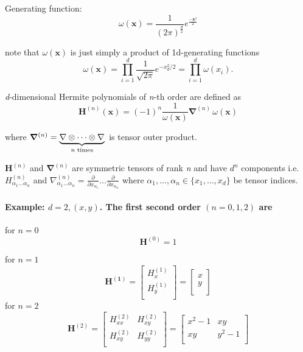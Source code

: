 \documentclass[draft]{article}
\begin{document}
Generating function:
\begin{equation}
	\omega(\bm{x}) = \frac{1}{(2\pi)^{\frac{d}{2}}}e^{\frac{-\bm{x}^2}{2}}
\end{equation}

note that $\omega(\bm{x})$ is just simply a product of 1d-generating functions
\begin{equation}
	\omega(\bm{x}) = \prod_{i=1}^{d} \frac{1}{\sqrt{2\pi}}e^{-x_d^2 / 2} = \prod_{i=1}^{d} \omega(x_i). \label{product_omega} 
\end{equation}

\textit{d}-dimensional Hermite polynomials of \textit{n}-th order are defined as
\begin{equation}
	\bm{H}^{(n)}(\bm{x}) = (-1)^{n}\frac{1}{\omega(\bm{x})}\bm{\nabla}^{(n)} \, \omega(\bm{x})
\end{equation}

where $\bm{\nabla}^{(n)} = \underbrace{\nabla \otimes\dots\otimes  \nabla}_{\text{\textit{n} times}} \, $ is tensor outer product.

$\bm{H}^{(n)}$ and $\bm{\nabla}^{(n)}$ are symmetric tensors of rank \textit{n} and have $d^n$ components i.e. $H^{(n)}_{\alpha_1\dots\alpha_n}$ and $ \nabla^{(n)}_{\alpha_1\dots\alpha_n} = \frac{\partial}{\partial x_{\alpha_1}} \dots \frac{\partial}{\partial x_{\alpha_n}}$ where $\alpha_1, \dots ,\alpha_n \in \{ x_1, \dots ,x_d \}$ be tensor indices.

\paragraph*{Example: \textnormal{$d = 2, (x, y)$. The first second order $(n=0,1,2)$ are}}
for $n=0$
$$
\bm{H}^{(0)} = 1
$$

for $n=1$
$$
\bm{H^{(1)}} = \begin{bmatrix}
	H^{(1)}_{x} \\
	H^{(1)}_{y} \\
\end{bmatrix}
=
\begin{bmatrix}
	x \\
	y \\
\end{bmatrix}
$$
for $n=2$
$$
\bm{H}^{(2)} = \begin{bmatrix}
	H^{(2)}_{xx} & H^{(2)}_{xy} \\
	H^{(2)}_{xy} & H^{(2)}_{yy} \\
\end{bmatrix}
=
\begin{bmatrix}
	x^2 - 1 & xy \\
	xy & y^2 - 1 \\
\end{bmatrix}
$$
\end{document}
